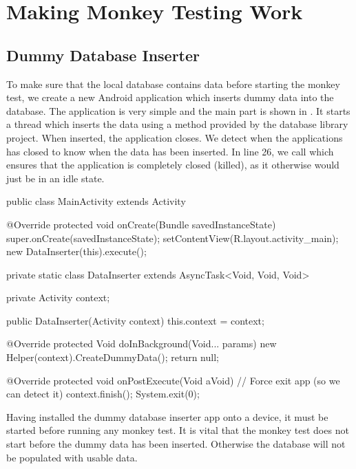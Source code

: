 \chapter{Making Monkey Testing Work}
\dummy

\section{Dummy Database Inserter}
To make sure that the local database contains data before starting the monkey test, we create a new Android application which inserts dummy data into the database. The application is very simple and the main part is shown in . It starts a thread which inserts the data using a method provided by the database library project. When inserted, the application closes. We detect when the applications has closed to know when the data has been inserted. In line 26, we call  which ensures that the application is completely closed (killed), as it otherwise would just be in an idle state.

\begin{javacode}[caption=Dummy database inserter \mono{MainActivity},label=lst:dummy_db_ins_main_activity]
public class MainActivity extends Activity {
    @Override
    protected void onCreate(Bundle savedInstanceState) {
        super.onCreate(savedInstanceState);
        setContentView(R.layout.activity_main);
        new DataInserter(this).execute();
    }

    private static class DataInserter extends AsyncTask<Void, Void, Void> {
        private Activity context;

        public DataInserter(Activity context) {
            this.context = context;
        }

        @Override
        protected Void doInBackground(Void... params) {
            new Helper(context).CreateDummyData();
            return null;
        }

        @Override
        protected void onPostExecute(Void aVoid) {
            // Force exit app (so we can detect it)
            context.finish();
            System.exit(0);
        }
    }
}
\end{javacode}

Having installed the dummy database inserter app onto a device, it must be started before running any monkey test. It is vital that the monkey test does not start before the dummy data has been inserted. Otherwise the database will not be populated with usable data.

